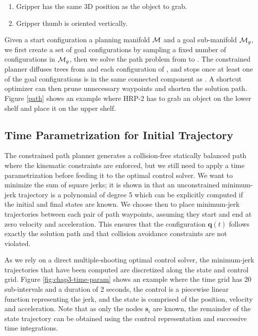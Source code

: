 \begin{enumerate}
  \item Gripper has the same 3D position as the object to grab.
  \item Gripper thumb is oriented vertically.
\end{enumerate}

Given a start configuration  a planning manifold $\mathcal{M}$
and a goal sub-manifold $\mathcal{M}_{g}$, we first create a set of goal
configurations  by sampling a fixed number of configurations
in $\mathcal{M}_{g}$, then we solve the path problem from  to
. The constrained planner diffuses trees from  and
each configuration of , and stops once at least one of the
goal configurations is in the same connected component as
. A shortcut optimizer can then prune unnecessary waypoints
and shorten the solution path. Figure \ref{path} shows an example
where HRP-2 has to grab an object on the lower shelf and place it on
the upper shelf.

\subsection{Time Parametrization for Initial Trajectory}
\label{subsec:chap3-time-parametrization}

The constrained path planner generates a collision-free statically
balanced path where the kinematic constraints are enforced, but we
still need to apply a time parametrization before feeding it to the
optimal control solver. We want to minimize the sum of square jerks;
it is shown in \cite{Flash1985} that an unconstrained minimum-jerk
trajectory is a polynomial of degree 5 which can be explicitly
computed if the initial and final states are known. We choose then to
place minimum-jerk trajectories between each pair of path waypoints,
assuming they start and end at zero velocity and acceleration. This
ensures that the configuration $\mathbf{q}(t)$ follows exactly the
solution path and that collision avoidance constraints are not
violated.

As we rely on a direct multiple-shooting optimal control solver, the
minimum-jerk trajectories that have been computed are discretized
along the state and control grid. Figure \ref{fig:chap3-time-param}
shows an example where the time grid has 20 sub-intervals and a
duration of 2 seconds, the control is a piecewise linear function
representing the jerk, and the state is comprised of the position,
velocity and acceleration. Note that as only the nodes $\mathbf{s}_i$
are known, the remainder of the state trajectory can be obtained using
the control representation and successive time integrations.

